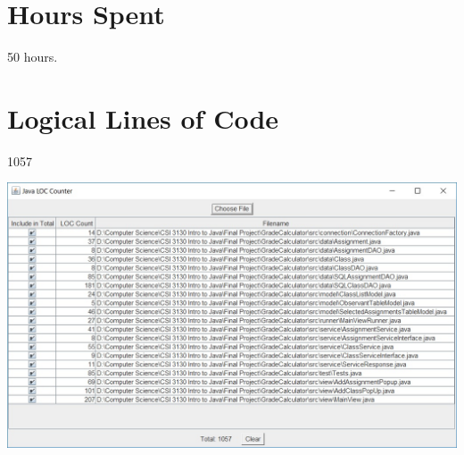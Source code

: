 \documentclass[12pt]{article}
\begin{document}
\newpage

\section*{Hours Spent}

50 hours.

\section*{Logical Lines of Code}

1057

\vspace{2cm}

\includegraphics[width=\textwidth]{LogicalLinesOfCode}
\end{document}
